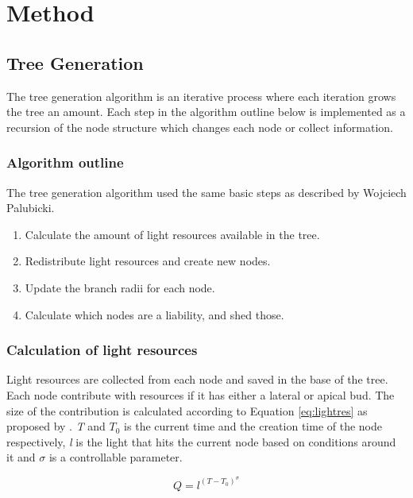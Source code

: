 \documentclass{article}
\begin{document}
  		
  			
  	\section{Method}
  		\subsection{Tree Generation}
  			
  			The tree generation algorithm is an iterative process where each iteration grows the tree an amount. Each step in the algorithm outline below is implemented as a recursion of the node structure which changes each node or collect information.
  			
  			\subsubsection*{Algorithm outline}
  			
  			The tree generation algorithm used the same basic steps as described by Wojciech Palubicki. \citep{palubicki2009self}
  			
  			\begin{enumerate}
  				\item Calculate the amount of light resources available in the tree.
  				\item Redistribute light resources and create new nodes.
  				\item Update the branch radii for each node.
  				\item Calculate which nodes are a liability, and shed those.
  			\end{enumerate}
  		
  			\subsubsection*{Calculation of light resources}
  			
  				Light resources are collected from each node and saved in the base of the tree. Each node contribute with resources if it has either a lateral or apical bud. The size of the contribution is calculated according to Equation \ref{eq:lightres} as proposed by \cite{yi2018tree}. \textit{T} and \textit{$T_0$} is the current time and the creation time of the node respectively, \textit{l} is the light that hits the current node based on conditions around it and $\sigma$ is a controllable parameter.
  				
  				\begin{equation}
  					\label{eq:lightres}
  					Q = l^{{(T-T_0)}^\sigma}
  				\end{equation}
  				
\end{document}

